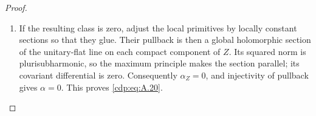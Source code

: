 \begin{proof}
\begin{enumerate}[label={$\langle1\rangle$\arabic*.},leftmargin=*]
\item If the resulting class is zero, adjust the local primitives by locally constant sections so that they glue. Their pullback is then a global holomorphic section of the unitary-flat line on each compact component of $Z$. Its squared norm is plurisubharmonic, so the maximum principle makes the section parallel; its covariant differential is zero. Consequently $\alpha_Z=0$, and injectivity of pullback gives $\alpha=0$. This proves \eqref{cdp:eq:A.20}.

\end{enumerate}
\end{proof}
